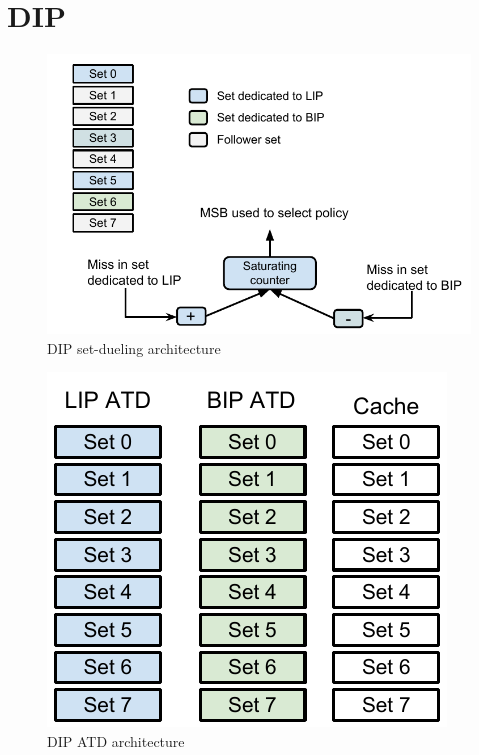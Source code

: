 \section{DIP}
\label{sec:algorithms:dip}

\begin{figure}
	\centering
	\includegraphics[width=\textwidth]{figures/algorithms/DIP_architecture}
	\caption{DIP set-dueling architecture}
	\label{fig:algorithms:dip:set_dueling}
\end{figure}

\begin{figure}
	\centering
	\includegraphics[width=\textwidth]{figures/algorithms/DIP_atd_architecture}
	\caption{DIP ATD architecture}
	\label{fig:algorithms:dip:atd}
\end{figure}

